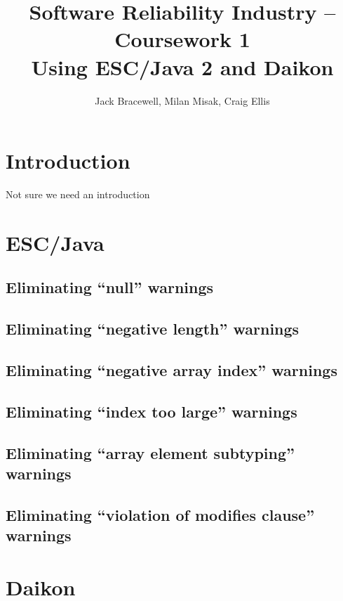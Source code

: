 \documentclass{article}
\title{Software Reliability  Industry -- Coursework 1 \\ Using ESC/Java 2 and Daikon}
\author{Jack Bracewell, Milan Misak, Craig Ellis}
\date{}
\begin{document}
\section{Introduction}

Not sure we need an introduction

\section{ESC/Java}

\subsection{Eliminating ``null'' warnings}

\subsection{Eliminating ``negative length'' warnings}

\subsection{Eliminating ``negative array index'' warnings}

\subsection{Eliminating ``index too large'' warnings}

\subsection{Eliminating ``array element subtyping'' warnings}

\subsection{Eliminating ``violation of modifies clause'' warnings}

\section{Daikon}
\end{document}
